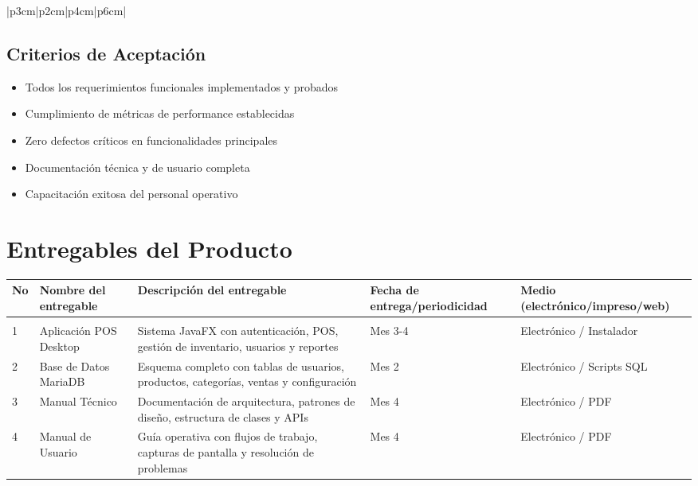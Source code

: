 \documentclass[12pt,letterpaper]{article}
\begin{document}
\begin{longtable}{|p{3cm}|p{2cm}|p{4cm}|p{6cm}|}
\subsection{Criterios de Aceptación}
\begin{itemize}
    \item Todos los requerimientos funcionales implementados y probados
    \item Cumplimiento de métricas de performance establecidas
    \item Zero defectos críticos en funcionalidades principales
    \item Documentación técnica y de usuario completa
    \item Capacitación exitosa del personal operativo
\end{itemize}

\section{Entregables del Producto}

\begin{longtable}{|>{\centering}p{1cm}|p{4cm}|p{6cm}|>{\centering}p{2.5cm}|>{\centering\arraybackslash}p{2.5cm}|}
\hline
\rowcolor{cobrablue!20}
\textbf{No} & \textbf{Nombre del entregable} & \textbf{Descripción del entregable} & \textbf{Fecha de entrega/periodicidad} & \textbf{Medio (electrónico/impreso/web)} \\
\hline
\endhead

\multicolumn{5}{|c|}{\cellcolor{cobraorange!20}\textbf{FASE 1: APLICACIÓN DE ESCRITORIO}} \\
\hline

1 & Aplicación POS Desktop & Sistema JavaFX con autenticación, POS, gestión de inventario, usuarios y reportes & Mes 3-4 & Electrónico / Instalador \\
\hline

2 & Base de Datos MariaDB & Esquema completo con tablas de usuarios, productos, categorías, ventas y configuración & Mes 2 & Electrónico / Scripts SQL \\
\hline

3 & Manual Técnico & Documentación de arquitectura, patrones de diseño, estructura de clases y APIs & Mes 4 & Electrónico / PDF \\
\hline

4 & Manual de Usuario & Guía operativa con flujos de trabajo, capturas de pantalla y resolución de problemas & Mes 4 & Electrónico / PDF \\
\hline


\end{longtable}
\end{longtable}
\end{document}
